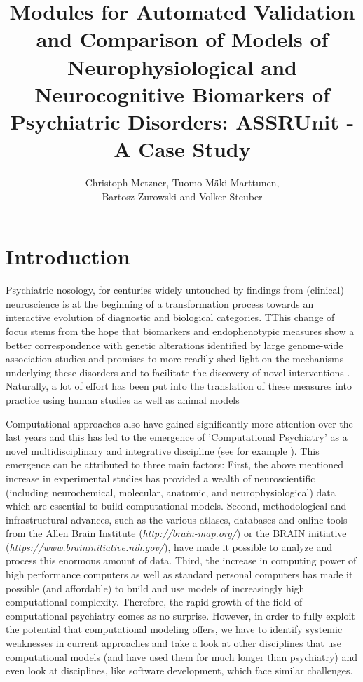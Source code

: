 \documentclass[a4paper,10pt]{article}
\title{Modules for Automated Validation and Comparison of Models of Neurophysiological and Neurocognitive Biomarkers of Psychiatric Disorders:
ASSRUnit - A Case Study}
\author{Christoph Metzner, Tuomo M\"aki-Marttunen, \\ Bartosz Zurowski and Volker Steuber}
\begin{document}
\lstset{language=Python}

\maketitle

\begin{abstract}

\end{abstract}

\section{Introduction}
Psychiatric nosology, for centuries widely untouched by findings from (clinical) neuroscience is at the beginning of a transformation process \cite{Friston2017} 
towards an interactive evolution of diagnostic and biological categories. TThis change of focus stems from the hope
that biomarkers and endophenotypic measures show a better correspondence with genetic 
alterations identified by large genome-wide association studies \cite{Meyer2006} and promises to more readily shed light on the mechanisms underlying
these disorders and to facilitate the discovery of novel interventions \cite{Siekmeier2015}.
Naturally, a lot of effort has been put into the translation of these measures into practice using human studies \cite{Perlis2011}
as well as animal models \cite{Markou2009}

Computational approaches also have gained significantly more attention over the last years and this has led to the emergence of 
'Computational Psychiatry'
as a novel multidisciplinary and integrative discipline (see for example \cite{Montague2012,Wang2014,Friston2014,Corlett2014,Stephan2014,Adams2016}).
This emergence can be attributed to three main factors: First, the above mentioned increase in experimental studies has provided 
a wealth of neuroscientific (including neurochemical, molecular, anatomic, and neurophysiological) data which are essential to build  computational models. Second, methodological and infrastructural advances,
such as the  various atlases, databases and online tools from the Allen Brain Institute (\textit{http://brain-map.org/}) or the BRAIN initiative 
(\textit{https://www.braininitiative.nih.gov/}),
have made it possible to analyze and process this enormous amount of data. Third, the increase in computing power of high performance
computers as well as standard personal computers has made it possible (and affordable) to build and use models of increasingly high computational 
complexity. Therefore, the rapid growth of the field of computational psychiatry comes as no surprise.
However, in order to fully exploit the potential that computational modeling offers, we have to identify systemic weaknesses
in current approaches and take a look at other disciplines that use computational models (and have used them for much longer than psychiatry)
and even look at disciplines, like software development, which face similar challenges.
\end{document}
